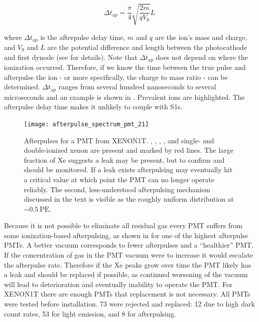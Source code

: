 \begin{equation}
\Delta t_{\mathrm{ap}} = \frac{\pi}{4} \sqrt{\frac{2 m}{q V_{0}}} L
\end{equation}

\noindent where $\Delta t_{\mathrm{ap}}$ is the afterpulse delay time, $m$ and $q$ are the ion's mass and charge, and $V_{0}$ and $L$ are
the potential difference and length between the photocathode and first dynode (see  for details).  Note that
$\Delta t_{\mathrm{ap}}$
does not depend on where the ionization occurred.  Therefore, if we know the time between the true pulse and afterpulse the ion - or more
specifically, the
charge to mass ratio - can be determined.  $\Delta t_{\mathrm{ap}}$ ranges from several hundred nanoseconds to several microseconds and an
example is shown in .  Prevalent ions are highlighted.  The afterpulse delay time makes it
unlikely to couple with S1s.

\begin{figure}
\centering
\texttt{[image: afterpulse\_spectrum\_pmt\_21]}
\caption{Afterpulses for a PMT from XENON1T.  , , , , and single- and double-ionized
xenon are present and marked by red lines.  The large fraction of Xe suggests a leak may be present, but to confirm  and
 should be monitored.  If a leak exists afterpulsing may eventually hit a critical value at which point
the PMT can no longer operate reliably.  The second, less-understood afterpulsing mechanism discussed in the text is visible as the
roughly uniform distribution at ${\sim}0.5\ \mathrm{PE}$.}
\label{fig:xenon1t_pmts_ap}
\end{figure}

Because it is not possible to eliminate all residual gas every PMT suffers from some ionization-based afterpulsing, as shown in
 for one of the highest afterpulse PMTs.  A better vacuum
corresponds to fewer afterpulses and a ``healthier'' PMT.  If the concentration of gas in the PMT vacuum were to increase
it would
escalate the afterpulse rate.  Therefore if the Xe peaks grow over time the PMT likely has a leak and should
be replaced if possible, as continued worsening of the vacuum will lead to deterioration and eventually inability to operate the
PMT.  For XENON1T there are enough PMTs that replacement is not necessary.  All PMTs were tested before
installation.  73 were rejected and replaced: 12 due to high dark count rates, 53 for light emission, and 8 for
afterpulsing.

